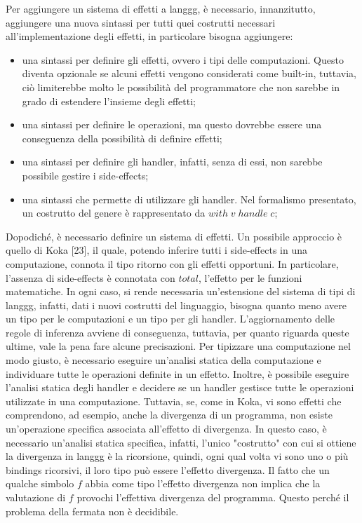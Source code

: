 \documentclass[10pt,a4paper]{article}
\begin{document}
Per aggiungere un sistema di effetti a langgg, è necessario, innanzitutto, aggiungere una nuova sintassi per tutti quei
costrutti necessari all'implementazione degli effetti, in particolare bisogna aggiungere:
\begin{itemize}
    \item una sintassi per definire gli effetti, ovvero i tipi delle computazioni. Questo diventa opzionale se alcuni
    effetti vengono considerati come built-in, tuttavia, ciò limiterebbe molto le possibilità del programmatore che non
    sarebbe in grado di estendere l'insieme degli effetti;
    \item una sintassi per definire le operazioni, ma questo dovrebbe essere una conseguenza della possibilità di
    definire effetti;
    \item una sintassi per definire gli handler, infatti, senza di essi, non sarebbe possibile gestire i side-effects;
    \item una sintassi che permette di utilizzare gli handler. Nel formalismo presentato, un costrutto del genere è
    rappresentato da $ with \; v \; handle \; c $;
\end{itemize}
Dopodiché, è necessario definire un sistema di effetti. Un possibile approccio è quello di Koka [23], il quale, potendo
inferire tutti i side-effects in una computazione, connota il tipo ritorno con gli effetti opportuni. In particolare,
l'assenza di side-effects è connotata con $ total $, l'effetto per le funzioni matematiche. In ogni caso, si rende
necessaria un'estensione del sistema di tipi di langgg, infatti, dati i nuovi costrutti del linguaggio, bisogna quanto
meno avere un tipo per le computazioni e un tipo per gli handler. L'aggiornamento delle regole di inferenza avviene di
conseguenza, tuttavia, per quanto riguarda queste ultime, vale la pena fare alcune precisazioni. Per tipizzare
una computazione nel modo giusto, è necessario eseguire un'analisi statica della computazione e individuare tutte le
operazioni definite in un effetto. Inoltre, è possibile eseguire l'analisi statica degli handler e decidere se un handler
gestisce tutte le operazioni utilizzate in una computazione. Tuttavia, se, come in Koka, vi sono effetti che comprendono,
ad esempio, anche la divergenza di un programma, non esiste un'operazione specifica associata all'effetto di divergenza.
In questo caso, è necessario un'analisi statica specifica, infatti, l'unico "costrutto" con cui si ottiene la divergenza
in langgg è la ricorsione,
quindi, ogni qual volta vi sono uno o più bindings ricorsivi, il loro tipo può essere l'effetto divergenza.
Il fatto che un qualche simbolo $ f $ abbia come tipo l'effetto divergenza non implica che la valutazione di $ f $
provochi l'effettiva divergenza del programma. Questo perché il problema della fermata non è decidibile.
\end{document}
